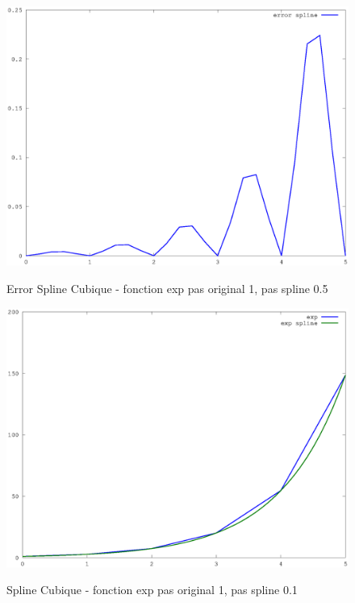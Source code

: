 \documentclass[a4paper,11pt]{article}
\begin{document}
\begin{figure}[h!]
  \begin{centering}
    \includegraphics[scale=0.5]{../exp_5_error}
    \label{rspro2}
    \par\end{centering}
  \caption{Error Spline Cubique - fonction exp pas original 1, pas spline 0.5}
  \label{fig:jacobi-conv}
\end{figure}


\begin{figure}[h!]
  \begin{centering}
    \includegraphics[scale=0.5]{../exp_10}
    \label{rspro2}
    \par\end{centering}
  \caption{Spline Cubique - fonction exp pas original 1, pas spline 0.1}
  \label{fig:jacobi-conv}
\end{figure}
\end{document}

